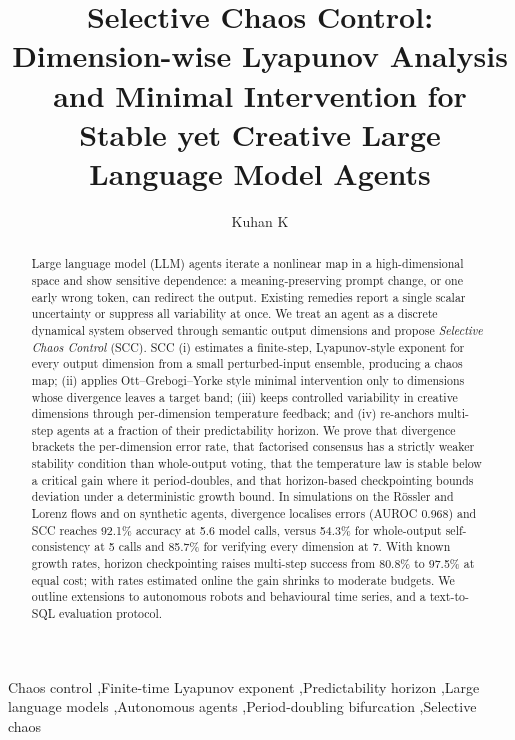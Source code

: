 \documentclass[preprint,12pt]{elsarticle}
\begin{document}
\begin{frontmatter}

\title{Selective Chaos Control: Dimension-wise Lyapunov Analysis and Minimal Intervention for Stable yet Creative Large Language Model Agents}

\author{Kuhan K}

\begin{abstract}
Large language model (LLM) agents iterate a nonlinear map in a high-dimensional space and show sensitive dependence: a meaning-preserving prompt change, or one early wrong token, can redirect the output. Existing remedies report a single scalar uncertainty or suppress all variability at once. We treat an agent as a discrete dynamical system observed through semantic output dimensions and propose \emph{Selective Chaos Control} (SCC). SCC (i) estimates a finite-step, Lyapunov-style exponent for every output dimension from a small perturbed-input ensemble, producing a chaos map; (ii) applies Ott--Grebogi--Yorke style minimal intervention only to dimensions whose divergence leaves a target band; (iii) keeps controlled variability in creative dimensions through per-dimension temperature feedback; and (iv) re-anchors multi-step agents at a fraction of their predictability horizon. We prove that divergence brackets the per-dimension error rate, that factorised consensus has a strictly weaker stability condition than whole-output voting, that the temperature law is stable below a critical gain where it period-doubles, and that horizon-based checkpointing bounds deviation under a deterministic growth bound. In simulations on the R\"ossler and Lorenz flows and on synthetic agents, divergence localises errors (AUROC 0.968) and SCC reaches 92.1\% accuracy at 5.6 model calls, versus 54.3\% for whole-output self-consistency at 5 calls and 85.7\% for verifying every dimension at 7. With known growth rates, horizon checkpointing raises multi-step success from 80.8\% to 97.5\% at equal cost; with rates estimated online the gain shrinks to moderate budgets. We outline extensions to autonomous robots and behavioural time series, and a text-to-SQL evaluation protocol.
\end{abstract}

\begin{keyword}
Chaos control \sep Finite-time Lyapunov exponent \sep Predictability horizon \sep Large language models \sep Autonomous agents \sep Period-doubling bifurcation \sep Selective chaos
\end{keyword}

\end{frontmatter}
\end{document}
